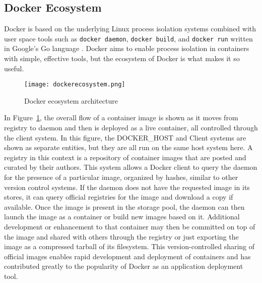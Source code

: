 \subsection{Docker Ecosystem} %
\label{sec:dockerecosystem}
Docker is based on the underlying Linux process isolation systems combined with user space tools such as \texttt{docker daemon}, \texttt{docker build}, and \texttt{docker run} written in Google's Go language \autocite{dockerarch1}. 
Docker aims to enable process isolation in containers with simple, effective tools, but the ecosystem of Docker is what makes it so useful.  
\begin{figure}
    \centering
    \texttt{[image: dockerecosystem.png]}
    \caption{Docker ecosystem architecture \autocite{dockerarch1}}
    \label{fig:dockerecosystem}
\end{figure}
In Figure~\ref{fig:dockerecosystem}, the overall flow of a container image is shown as it moves from registry to daemon and then is deployed as a live container, all controlled through the client system.  
In this figure, the DOCKER\_HOST and Client systems are shown as separate entities, but they are all run on the same host system here.
A registry in this context is a repository of container images that are posted and curated by their authors.
This system allows a Docker client to query the daemon for the presence of a particular image, organized by hashes, similar to other version control systems.  
If the daemon does not have the requested image in its stores, it can query official registries for the image and download a copy if available.  
Once the image is present in the storage pool, the daemon can then launch the image as a container or build new images based on it.  
Additional development or enhancement to that container may then be committed on top of the image and shared with others through the registry or just exporting the image as a compressed tarball of its filesystem.  
This version-controlled sharing of official images enables rapid development and deployment of containers and has contributed greatly to the popularity of Docker as an application deployment tool.

